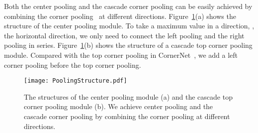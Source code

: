 \documentclass[10pt,twocolumn,letterpaper]{article}
\begin{document}
Both the center pooling and the cascade corner pooling can be easily achieved by combining the corner pooling~\cite{law2018cornernet} at different directions. Figure~\ref{PoolingStructure}{\color{red}(a)} shows the structure of the center pooling module. To take a maximum value in a direction, \eg, the horizontal direction, we only need to connect the left pooling and the right pooling in series. Figure~\ref{PoolingStructure}{\color{red}(b)} shows the structure of a cascade top corner pooling module. Compared with the top corner pooling in CornerNet~\cite{law2018cornernet}, we add a left corner pooling before the top corner pooling.
\begin{figure}[tb]
  \centering 
  \texttt{[image: PoolingStructure.pdf]}
  \vspace{-4ex}
  \caption{The structures of the center pooling module (a) and the cascade top corner pooling module (b). We achieve center pooling and the cascade corner pooling by combining the corner pooling at different directions.} 
  \label{PoolingStructure} 
\end{figure}
\end{document}
